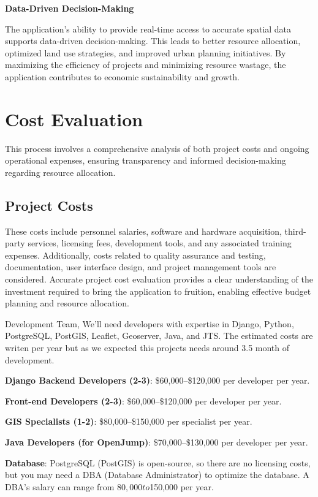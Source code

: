 \textbf{Data-Driven Decision-Making}

The application's ability to provide real-time access to accurate spatial data supports data-driven decision-making.
This leads to better resource allocation, optimized land use strategies, and improved urban planning initiatives.
By maximizing the efficiency of projects and minimizing resource wastage, the application contributes to economic sustainability and growth.


\section{Cost Evaluation}\label{sec:cost-evaluation}
This process involves a comprehensive analysis of both project costs and ongoing operational expenses, ensuring transparency and informed decision-making regarding resource allocation.
\subsection{Project Costs}\label{subsec:project-costs}
These costs include personnel salaries, software and hardware acquisition, third-party services, licensing fees, development tools, and any associated training expenses.
Additionally, costs related to quality assurance and testing, documentation, user interface design, and project management tools are considered.
Accurate project cost evaluation provides a clear understanding of the investment required to bring the application to fruition, enabling effective budget planning and resource allocation.


Development Team, We'll need developers with expertise in Django, Python, PostgreSQL, PostGIS, Leaflet, Geoserver, Java, and JTS.
The estimated costs are writen per year but as we expected this projects needs around 3.5 month of development.

\textbf{Django Backend Developers (2-3)}: \$60,000--\$120,000 per developer per year.

\textbf{Front-end Developers (2-3)}: \$60,000--\$120,000 per developer per year.

\textbf{GIS Specialists (1-2)}: \$80,000--\$150,000 per specialist per year.

\textbf{Java Developers (for OpenJump)}: \$70,000--\$130,000 per developer per year.

\textbf{Database}: PostgreSQL (PostGIS) is open-source, so there are no licensing costs, but you may need a DBA (Database Administrator) to optimize the database. A DBA's salary can range from $80,000 to $150,000 per year.

